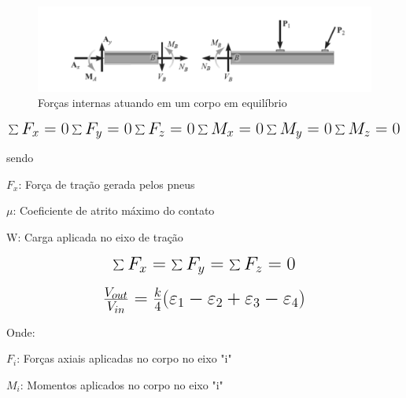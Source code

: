 
\begin{figure}[htb]
	\caption{\label{fig:1010} Forças internas atuando em um corpo em equilíbrio}
	\begin{center}
		\includegraphics[width=\textwidth]{pictures/1010.png}
	\end{center}
\end{figure}


\begin{equation}\label{eq:Eq_101}%
\mbox{\fontsize{17.28}{21.6}\selectfont\( %
\sum F_{x} = 0 \sum F_{y} = 0 \sum F_{z} = 0
\sum M_{x} = 0 \sum M_{y} = 0 \sum M_{z} = 0
\)} %
\end{equation}

\newline

sendo

$F_{x}$: Força de tração gerada pelos pneus

$\mu$: Coeficiente de atrito máximo do contato

W: Carga aplicada no eixo de tração


\begin{equation}\label{eq:Eq_110}%
\mbox{\fontsize{17.28}{21.6}\selectfont\( %
\sum F_{x} = \sum F_{y} = \sum F_{z} = 0
\)} %
\end{equation}

\begin{equation}\label{eq:Eq_220}%
\mbox{\fontsize{17.28}{21.6}\selectfont\( %
\frac{V_{out}}{V_{in}} = \frac{k}{4}(\varepsilon_1 - \varepsilon_2 + \varepsilon_3 - \varepsilon_4)
\)} %
\end{equation}

\hfill

Onde:

$F_{i}$: Forças axiais aplicadas no corpo no eixo "i"

$M_{i}$: Momentos aplicados no corpo no eixo "i"



